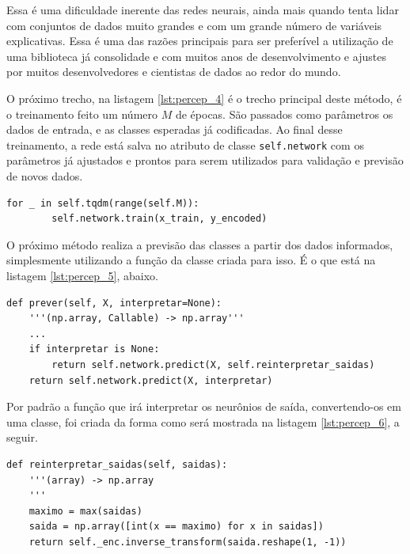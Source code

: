 Essa é uma dificuldade inerente das redes neurais, ainda mais quando tenta lidar com conjuntos de dados muito grandes e com um grande número de variáveis explicativas. Essa é uma das razões principais para ser preferível a utilização de uma biblioteca já consolidade e com muitos anos de desenvolvimento e ajustes por muitos desenvolvedores e cientistas de dados ao redor do mundo.

O próximo trecho, na listagem \ref{lst:percep_4} é o trecho principal deste método, é o treinamento  feito um número $M$ de épocas. São passados como parâmetros os dados de entrada, e as classes esperadas já codificadas. Ao final desse treinamento, a rede está salva no atributo de classe \texttt{self.network} com os parâmetros já ajustados e prontos para serem utilizados para validação e previsão de novos dados.

\begin{scriptsize}
\estiloR
\begin{lstlisting}[caption={Trecho da classe \eng{Perceptron}}, label={lst:percep_4}, escapeinside={\%}]
    for _ in self.tqdm(range(self.M)):
        self.network.train(x_train, y_encoded)
\end{lstlisting}
\end{scriptsize}

O próximo método realiza a previsão das classes a partir dos dados informados, simplesmente utilizando a função da classe  criada para isso. É o que está na listagem \ref{lst:percep_5}, abaixo. 

\begin{scriptsize}
\estiloR
\begin{lstlisting}[caption={Trecho da classe \eng{Perceptron}}, label={lst:percep_5}, escapeinside={\%}]
def prever(self, X, interpretar=None):
    '''(np.array, Callable) -> np.array'''
    ...
    if interpretar is None:
        return self.network.predict(X, self.reinterpretar_saidas)
    return self.network.predict(X, interpretar)
\end{lstlisting}
\end{scriptsize}

Por padrão a função que irá interpretar os neurônios de saída, convertendo-os em uma classe, foi criada da forma como será mostrada na listagem \ref{lst:percep_6}, a seguir.

\begin{scriptsize}
\estiloR
\begin{lstlisting}[caption={Trecho da classe \eng{Perceptron}}, label={lst:percep_6}, escapeinside={\%}]
def reinterpretar_saidas(self, saidas):
    '''(array) -> np.array
    '''
    maximo = max(saidas)
    saida = np.array([int(x == maximo) for x in saidas])
    return self._enc.inverse_transform(saida.reshape(1, -1))
\end{lstlisting}
\end{scriptsize}

